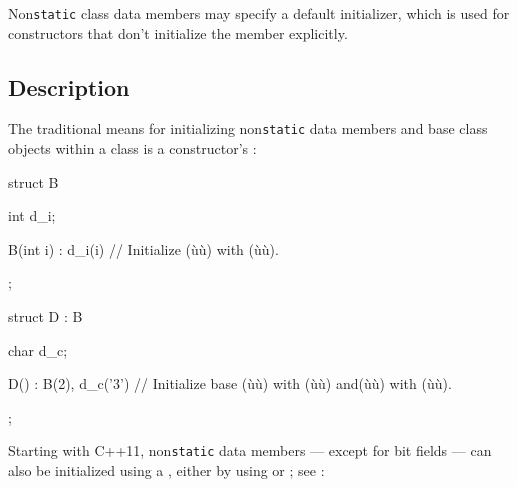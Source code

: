

\label{default-member-initializers}
\setcounter{table}{0}
\setcounter{footnote}{0}
\setcounter{lstlisting}{0}

Non\lstinline!static! class data members may specify a default initializer,
which is used for constructors that don't initialize the member
explicitly.

\subsection[Description]{Description}\label{description}

The traditional means for initializing non\lstinline!static! data members
and base class objects within a class is a constructor's :

\begin{emcppslisting}
struct B
{
    int d_i;

    B(int i) : d_i(i) { }     // Initialize (ù{}ù) with (ù{}ù).
};

struct D : B
{
    char d_c;

    D() : B(2), d_c('3') { }  // Initialize base (ù{}ù) with (ù{}ù) and(ù{}ù) with (ù{}ù).
};
\end{emcppslisting}
    

Starting with C++11, non\lstinline!static! data members --- except for bit
fields --- can also be initialized using a , either by using  or
; see
:

